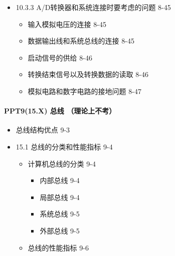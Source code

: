 \documentclass[zihao=5,linespread=1,heading=false,autoindent=0pt]{ctexart}
\newenvironment{citemize}%
{\begin{itemize}[parsep=0pt,itemsep=0pt,topsep=0pt,partopsep=0pt,labelwidth=1em,leftmargin=*]}
{\end{itemize}}
\theoremstyle{exampstyle} \newtheorem{definition}{定义}[section]
\theoremstyle{exampstyle} \newtheorem{example}{例}[section]
\theoremstyle{exampstyle} \newtheorem{theorem}{定理}[section]
\theoremstyle{exampstyle} \newtheorem{lemma}{引理}[section]
\theoremstyle{exampstyle} \newtheorem{myproof}{证明}[section]
\begin{document}
\begin{multicols*}{3}
\begin{citemize}
\begin{citemize}
\begin{citemize}
        \item
          计数式A/D转换 8-35
        \item
          双积分式A/D转换（不讲）8-37
        \item
          逐次逼近式A/D转换 8-40
        \item
          用软件和D/A转换器来实现A/D转换 8-42
        \end{citemize}
      \item
        10.3.3 A/D转换器和系统连接时要考虑的问题 8-45
    
        \begin{citemize}
         
        \item
          输入模拟电压的连接 8-45
        \item
          数据输出线和系统总线的连接 8-45
        \item
          启动信号的供给 8-46
        \item
          转换结束信号以及转换数据的读取 8-46
        \item
          模拟电路和数字电路的接地问题 8-47
        \end{citemize}
      \end{citemize}
    \end{citemize}
    
    \hypertarget{ppt915.x-ux603bux7ebf-ux7406ux8bbaux4e0aux4e0dux8003}{%
    \paragraph{PPT9(15.X) 总线
    （理论上不考）}\label{ppt915.x-ux603bux7ebf-ux7406ux8bbaux4e0aux4e0dux8003}}
    
    \begin{citemize}
    \item
      总线结构优点 9-3
    \item
      15.1 总线的分类和性能指标 9-4
    
      \begin{citemize}
       
      \item
        计算机总线的分类 9-4
    
        \begin{citemize}
         
        \item
          内部总线 9-4
        \item
          局部总线 9-4
        \item
          系统总线 9-5
        \item
          外部总线 9-5
        \end{citemize}
      \item
        总线的性能指标 9-6
    

\end{citemize}
\end{citemize}
\end{multicols*}
\end{document}
